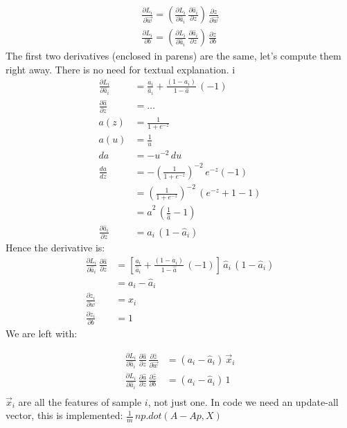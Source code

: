 \begin{align}
  \frac{\partial L_i}{\partial \vec{w}} = 
  \left(\frac{\partial L_i}{\partial \hat{a}_i}\, \frac{\partial \hat{a}_i}{\partial z}\right)\,\frac{\partial z}{\partial \vec{w}}\\
  \frac{\partial L_i}{\partial b} = 
  \left(\frac{\partial L_i}{\partial \hat{a}_i}\,\frac{\partial \hat{a}_i}{\partial z}\right)\,\frac{\partial z}{\partial b}
\end{align}
The first two derivatives (enclosed in parens) are the same, let's compute them right away. There is no need for textual explanation.
i
\begin{align*}
  \frac{\partial L_i}{\partial \hat{a}_i} &= \frac{a_i}{\hat{a}_i} + \frac{(1-a_i)}{1-\hat{a}}\,(-1) \\
  \frac{\partial \hat{a}}{\partial z} &= \ldots  \label{eq:derZ}\\
  a(z)&= \frac{1}{1+e^{-z}}\\
  a(u)&=\frac{1}{u}\\
  da&=-u^{-2}\,du\\
  \frac{da}{dz}&=-\left(\frac{1}{1+e^{-z}}\right)^{-2}\,e^{-z}(-1)\\
  &=\left(\frac{1}{1+e^{-z}}\right)^{-2}\,(e^{-z} + 1 -1)\\
  &= \hat{a}^2\,(\frac{1}{\hat{a}} -1) \\
  \frac{\partial \hat{a}_i}{\partial z} &= \hat{a}_i\,(1-\hat{a}_i)
\end{align*}
Hence the derivative is:
\begin{align*}
  \frac{\partial L_i}{\partial \hat{a}_i}\,\frac{\partial \hat{a}}{\partial z} &= \left[ \frac{a_i}{\hat{a}_i} + \frac{(1-a_i)}{1-\hat{a}}\,(-1) \right]\,\hat{a}_i\,(1-\hat{a}_i)\\
  &= a_i - \hat{a}_i\\
  \frac{\partial z_i}{\partial w} &= x_i\\
  \frac{\partial z_i}{\partial b} &= 1
\end{align*}
We are left with:

\begin{align*}
  \frac{\partial L_i}{\partial \hat{a}_i}\,\frac{\partial \hat{a}}{\partial z}\,\frac{\partial \hat{z}}{\partial \vec{w}} &= \left(a_i - \hat{a}_i\right)\,\vec{x}_i\\
  \frac{\partial L_i}{\partial \hat{a}_i}\,\frac{\partial \hat{a}}{\partial z}\,\frac{\partial \hat{z}}{\partial b} &= \left(a_i - \hat{a}_i\right)\,1\\
\end{align*}
$\vec{x}_i$ are all the features of sample $i$, not just one.
In code we need an update-all vector, this is implemented:
$\frac{1}{m}\,np.dot(A-Ap, X)$


